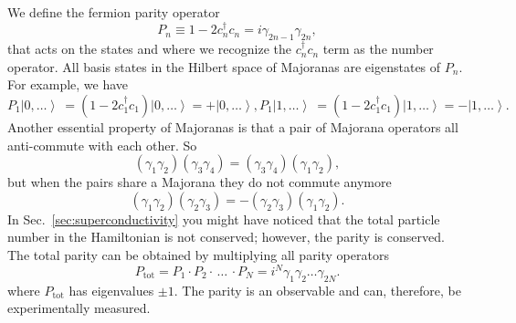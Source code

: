 We define the fermion parity operator
\begin{equation}
P_{n}\equiv1-2c_{n}^{\dagger}c_{n}=i\gamma_{2n-1}\gamma_{2n},
\end{equation}
that acts on the states and where we recognize the $c_{n}^{\dagger}c_{n}$ term as the number operator.
All basis states in the Hilbert space of Majoranas are eigenstates of $P_{n}$.
For example, we have
\begin{subequations}
\begin{equation}
P_{1}\left|0,\dots\right\rangle \ =(1-2c_{1}^{\dagger}c_{1})\left|0,\dots\right\rangle =+\left|0,\dots\right\rangle ,
\end{equation}

\begin{equation}
P_{1}\left|1,\dots\right\rangle \ =(1-2c_{1}^{\dagger}c_{1})\left|1,\dots\right\rangle =-\left|1,\dots\right\rangle .
\end{equation}
\end{subequations}
Another essential property of Majoranas is that a pair of Majorana operators all anti-commute with each other.
So
\begin{equation}
(\gamma_{1}\gamma_{2})(\gamma_{3}\gamma_{4})=(\gamma_{3}\gamma_{4})(\gamma_{1}\gamma_{2}),
\end{equation}
but when the pairs share a Majorana they do not commute anymore
\begin{equation}
(\gamma_{1}\gamma_{2})(\gamma_{2}\gamma_{3})=-(\gamma_{2}\gamma_{3})(\gamma_{1}\gamma_{2}).
\end{equation}
In Sec.~\ref{sec:superconductivity} you might have noticed that the total particle number in the Hamiltonian is not conserved; however, the parity is conserved.
The total parity can be obtained by multiplying all parity operators
\begin{equation}
P_{\textrm{tot}}=P_{1}\cdot P_{2}\cdot\,\dots\,\cdot P_{N}=i^{N}\gamma_{1}\gamma_{2}\dots\gamma_{2N}.
\end{equation}
where $P_{\textrm{tot}}$ has eigenvalues $\pm1$.
The parity is an observable and can, therefore, be experimentally measured.

